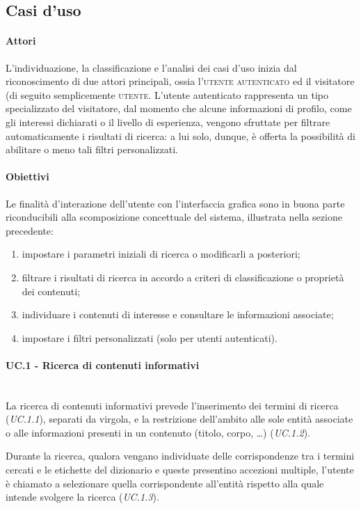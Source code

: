 \subsection{Casi d'uso}

\paragraph{Attori}
L'individuazione, la classificazione e l'analisi dei casi d'uso inizia dal riconoscimento di due attori principali, ossia l'\textsc{utente autenticato} ed il visitatore (di seguito semplicemente \textsc{utente}. L'utente autenticato rappresenta un tipo specializzato del visitatore, dal momento che alcune informazioni di profilo, come gli interessi dichiarati o il livello di esperienza, vengono sfruttate per filtrare automaticamente i risultati di ricerca: a lui solo, dunque, è offerta la possibilità di abilitare o meno tali filtri personalizzati.

\paragraph{Obiettivi}
Le finalità d'interazione dell'utente con l'interfaccia grafica sono in buona parte riconducibili alla scomposizione concettuale del sistema, illustrata nella sezione precedente:
\begin{enumerate}
	\item impostare i parametri iniziali di ricerca o modificarli a posteriori;
	\item filtrare i risultati di ricerca in accordo a criteri di classificazione o proprietà dei contenuti;
	\item individuare i contenuti di interesse e consultare le informazioni associate;
	\item impostare i filtri personalizzati (solo per utenti autenticati).
\end{enumerate}

\paragraph{UC.1 - Ricerca di contenuti informativi} \hfill \\
La ricerca di contenuti informativi prevede l'inserimento dei termini di ricerca (\textit{UC.1.1}), separati da virgola, e la restrizione dell'ambito alle sole entità associate o alle informazioni presenti in un contenuto (titolo, corpo, \ldots) (\textit{UC.1.2}).

Durante la ricerca, qualora vengano individuate delle corrispondenze tra i termini cercati e le etichette del dizionario e queste presentino accezioni multiple, l'utente è chiamato a selezionare quella corrispondente all'entità rispetto alla quale intende svolgere la ricerca (\textit{UC.1.3}).

